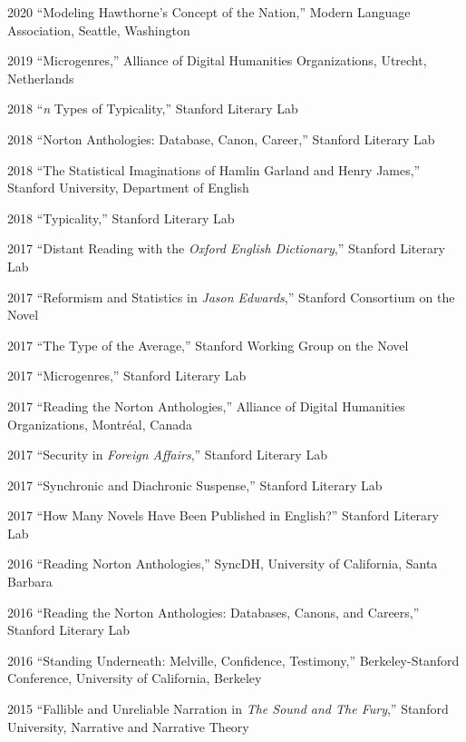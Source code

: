 \documentclass[12pt,letterpaper]{report}
\begin{document}
\begin{tablist}
	\item[2020] \tab{}\enquote{Modeling Hawthorne's Concept of the Nation,} Modern Language Association, Seattle, Washington
	\item[2019] \tab{}\enquote{Microgenres,} Alliance of Digital Humanities Organizations, Utrecht, Netherlands
	\item[2018] \tab{}\enquote{\emph{n} Types of Typicality,} Stanford Literary Lab
	\item[2018] \tab{}\enquote{Norton Anthologies: Database, Canon, Career,} Stanford Literary Lab
	\item[2018] \tab{}\enquote{The Statistical Imaginations of Hamlin Garland and Henry James,} Stanford University, Department of English
	\item[2018] \tab{}\enquote{Typicality,} Stanford Literary Lab
	\item[2017] \tab{}\enquote{Distant Reading with the \emph{Oxford English Dictionary},} Stanford Literary Lab
	\item[2017] \tab{}\enquote{Reformism and Statistics in \emph{Jason Edwards},} Stanford Consortium on the Novel
	\item[2017] \tab{}\enquote{The Type of the Average,} Stanford Working Group on the Novel
	\item[2017] \tab{}\enquote{Microgenres,} Stanford Literary Lab
	\item[2017] \tab{}\enquote{Reading the Norton Anthologies,} Alliance of Digital Humanities Organizations, Montréal, Canada
	\item[2017] \tab{}\enquote{Security in \emph{Foreign Affairs},} Stanford Literary Lab
	\item[2017] \tab{}\enquote{Synchronic and Diachronic Suspense,} Stanford Literary Lab
	\item[2017] \tab{}\enquote{How Many Novels Have Been Published in English?} Stanford Literary Lab
	\item[2016] \tab{}\enquote{Reading Norton Anthologies,} SyncDH, University of California, Santa Barbara
	\item[2016] \tab{}\enquote{Reading the Norton Anthologies: Databases, Canons, and Careers,} Stanford Literary Lab
	\item[2016] \tab{}\enquote{Standing Underneath: Melville, Confidence, Testimony,} Berkeley-Stanford Conference, University of California, Berkeley
	\item[2015] \tab{}\enquote{Fallible and Unreliable Narration in \emph{The Sound and The Fury},} Stanford University, Narrative and Narrative Theory

\end{tablist}
\end{document}
